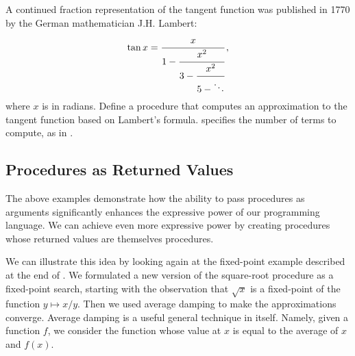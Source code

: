 \begin{exercise}
	\label{Exercise 1.39}
	A continued fraction  representation of the tangent function was published in 1770 by the German mathematician J.H. Lambert:
	\[
		\tan x = \cfrac{x}{1 - \cfrac{x^2}{3 - \cfrac{x^2}{5 - \ddots}}}\,,
	\]
	where \( x \) is in radians.
	Define a procedure  that computes an approximation to the tangent function based on Lambert’s formula.
	 specifies the number of terms to compute, as in .
\end{exercise}



\subsection{Procedures as Returned Values}
\label{Section 1.3.4}

The above examples demonstrate how the ability to pass procedures as arguments significantly enhances the expressive power of our programming language.
We can achieve even more expressive power by creating procedures whose returned values are themselves procedures.

We can illustrate this idea by looking again at the fixed-point example described at the end of .
We formulated a new version of the square-root procedure as a fixed-point search, starting with the observation that \( \sqrt{x} \) is a fixed-point of the function \( y \mapsto x / y \).
Then we used average damping to make the approximations converge.
Average damping is a useful general technique in itself.
Namely, given a function \( f \), we consider the function whose value at \( x \) is equal to the average of \( x \) and \( f(x) \).

